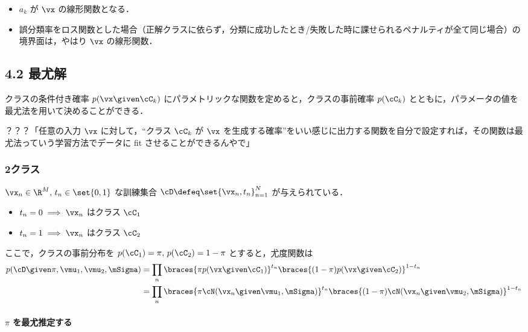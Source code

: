 \begin{itemize}
  \item $a_k$ が $\vx$ の線形関数となる．
  \item 誤分類率をロス関数とした場合（正解クラスに依らず，分類に成功したとき/失敗した時に課せられるペナルティが全て同じ場合）の境界面は，やはり $\vx$ の線形関数．
\end{itemize}

\setcounter{equation}{70}
\subsection*{4.2 最尤解}

クラスの条件付き確率 $p(\vx \given \cC_k)$ にパラメトリックな関数を定めると，クラスの事前確率 $p(\cC_k)$ とともに，パラメータの値を最尤法を用いて決めることができる．

\begin{alertinfo}
？？？「任意の入力 $\vx$ に対して，``クラス $\cC_k$ が $\vx$ を生成する確率''をいい感じに出力する関数を自分で設定すれば，その関数は最尤法っていう学習方法でデータに fit させることができるんやで」
\end{alertinfo}

\subsubsection*{2クラス}

$\vx_n \in \R^M,\, t_n \in \set{0,1}$ な訓練集合 $\cD \defeq \set{\vx_n, t_n}_{n=1}^N$ が与えられている．
\begin{itemize}
  \item $t_n = 0 \implies \vx_n$ はクラス $\cC_1$
  \item $t_n = 1 \implies \vx_n$ はクラス $\cC_2$
\end{itemize}

ここで，クラスの事前分布を $p(\cC_1) = \pi,\, p(\cC_2) = 1 - \pi$ とすると，尤度関数は
\begin{align}
  p(\cD \given \pi, \vmu_1, \vmu_2, \mSigma) & = \prod_n \braces{\pi p(\vx \given \cC_1)}^{t_n} \braces{(1 - \pi) p(\vx \given \cC_2)}^{1 - t_n} \notag \\
  & = \prod_n \braces{\pi \cN(\vx_n \given \vmu_1, \mSigma)}^{t_n} \braces{(1 - \pi) \cN(\vx_n \given \vmu_2, \mSigma)}^{1 - t_n}
\end{align}

\paragraph{$\pi$ を最尤推定する}

